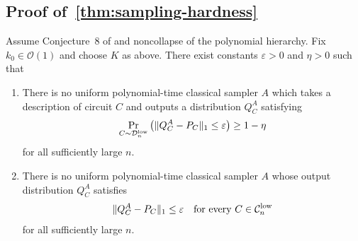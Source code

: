 \documentclass{article}
\theoremstyle{plain}
\theoremstyle{definition}
\theoremstyle{remark}
\begin{document}
\subsection{Proof of~\cref{thm:sampling-hardness}}
\label{app:sampling-hardness}
Assume Conjecture~8 of \cite{Bremner17} and noncollapse of the polynomial
hierarchy. Fix $k_0\in\mathcal{O}(1)$ and choose $K$ as above. There exist constants $\varepsilon>0$ and $\eta>0$ such that
\begin{enumerate}
    \item There is no uniform polynomial-time classical sampler $A$ which takes a description of circuit $C$ and outputs a distribution $Q_C^A$ satisfying
    \begin{equation} \label{eq:low-rank-average-hardness}
    \Pr_{C\sim\mathcal D_n^{\rm low}}\left(\|Q_C^A-P_C\|_1\leq\varepsilon \right) \geq 1 - \eta
    \end{equation}
    for all sufficiently large $n$.
    \item There is no uniform polynomial-time classical sampler $A$ whose output distribution $Q_C^A$ satisfies
    \begin{equation}
    \|Q_C^A-P_C\|_1\leq\varepsilon \quad\text{for every } C\in\mathcal{C}_n^{\rm low}
    \label{eq:low-rank-sampling-error}
    \end{equation}
    for all sufficiently large $n$.
\end{enumerate}
\end{document}
